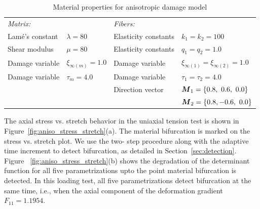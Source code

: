 \documentclass[12pt]{article}
\numberwithin{equation}{section}
\begin{document}
\begin{table}[H]
  \begin{center}
    \begin{tabular}{ l l l l }
      \toprule
      \it{Matrix}:
      &
      
      &
     
      \it{Fibers}:
      
      &
      \\
      Lam\'{e}'s constant
      &
      $\lambda=80$
      &
      Elasticity constants
      &
      $k_1 = k_2 = 100$
      \\
      Shear modulus
      &
      $\mu = 80$
      &
      Elasticity constants
      &
      $q_1 = q_2 = 1.0$      
      \\
      Damage variable  
      &
      $\xi_{\infty(m)} = 1.0$
      &
      Damage variable
      &
      $\xi_{\infty(1)} = \xi_{\infty(2)} = 1.0$      
      \\
      Damage variable   
      &
      $\tau_m = 4.0$
      &
      Damage variable
      &
      $\tau_1 = \tau_2 = 4.0$
      \\
      &
      
      &
      Direction vector
      &
      ${\boldsymbol{M}}_1 = \{ 0.8,~0.6,~0.0\}$
      \\
      &

      &
	       
      &
      ${\boldsymbol{M}}_2 = \{ 0.8,-0.6,~0.0\}$
      \\
      \bottomrule
    \end{tabular}
    \caption{Material properties for anisotropic damage model}
    \label{tab:aniso_material}
  \end{center}
\end{table}

The axial stress vs. stretch behavior in the uniaxial tension test is 
shown in Figure~\ref{fig:aniso_stress_stretch}(a). The material 
bifurcation is marked on the stress vs. stretch plot. We use the two-
step procedure along with the adaptive time increment to detect 
bifurcation, as detailed in Section~\ref{sec:detection}. Figure~
\ref{fig:aniso_stress_stretch}(b) shows the degradation of the 
determinant function for all five parametrizations upto the point 
material bifurcation is detected. In this loading test, all five 
parametrizations detect bifurcation at the same time, i.e., when the 
axial component of the deformation gradient $F_{11} = 1.1954$. 
\end{document}
